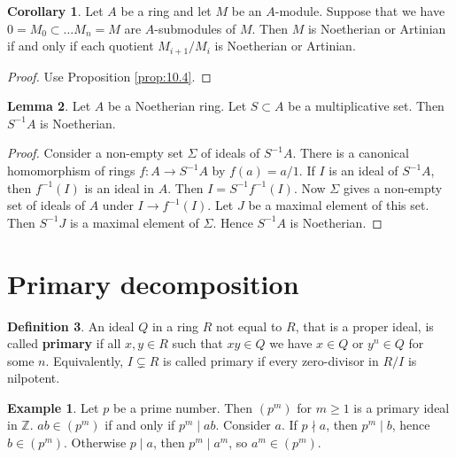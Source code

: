\documentclass{article}
\newcommand{\Z}{\mathbb{Z}}
\newcommand{\rb}[1]{\left( #1 \right)}
\theoremstyle{definition}\newtheorem{definition}{Definition}[section]
\theoremstyle{definition}\newtheorem{remark}[definition]{Remark}
\theoremstyle{definition}\newtheorem*{example}{Example}
\theoremstyle{definition}\newtheorem*{note}{Note}
\newtheorem{lemma}[definition]{Lemma}
\newtheorem{corollary}[definition]{Corollary}
\begin{document}
\begin{corollary}
\label{cor:10.6}
Let $ A $ be a ring and let $ M $ be an $ A $-module. Suppose that we have $ 0 = M_0 \subset \dots M_n = M $ are $ A $-submodules of $ M $. Then $ M $ is Noetherian or Artinian if and only if each quotient $ M_{i + 1} / M_i $ is Noetherian or Artinian.
\end{corollary}

\begin{proof}
Use Proposition \ref{prop:10.4}.
\end{proof}

\begin{lemma}
Let $ A $ be a Noetherian ring. Let $ S \subset A $ be a multiplicative set. Then $ S^{-1}A $ is Noetherian.
\end{lemma}

\begin{proof}
Consider a non-empty set $ \Sigma $ of ideals of $ S^{-1}A $. There is a canonical homomorphism of rings $ f : A \to S^{-1}A $ by $ f\rb{a} = a / 1 $. If $ I $ is an ideal of $ S^{-1}A $, then $ f^{-1}\rb{I} $ is an ideal in $ A $. Then $ I = S^{-1}f^{-1}\rb{I} $. Now $ \Sigma $ gives a non-empty set of ideals of $ A $ under $ I \to f^{-1}\rb{I} $. Let $ J $ be a maximal element of this set. Then $ S^{-1}J $ is a maximal element of $ \Sigma $. Hence $ S^{-1}A $ is Noetherian.
\end{proof}

\section{Primary decomposition}

\begin{definition}
An ideal $ Q $ in a ring $ R $ not equal to $ R $, that is a proper ideal, is called \textbf{primary} if all $ x, y \in R $ such that $ xy \in Q $ we have $ x \in Q $ or $ y^n \in Q $ for some $ n $. Equivalently, $ I \subsetneq R $ is called primary if every zero-divisor in $ R / I $ is nilpotent.
\end{definition}

\begin{example}
Let $ p $ be a prime number. Then $ \rb{p^m} $ for $ m \ge 1 $ is a primary ideal in $ \Z $. $ ab \in \rb{p^m} $ if and only if $ p^m \mid ab $. Consider $ a $. If $ p \nmid a $, then $ p^m \mid b $, hence $ b \in \rb{p^m} $. Otherwise $ p \mid a $, then $ p^m \mid a^m $, so $ a^m \in \rb{p^m} $.
\end{example}
\end{document}

